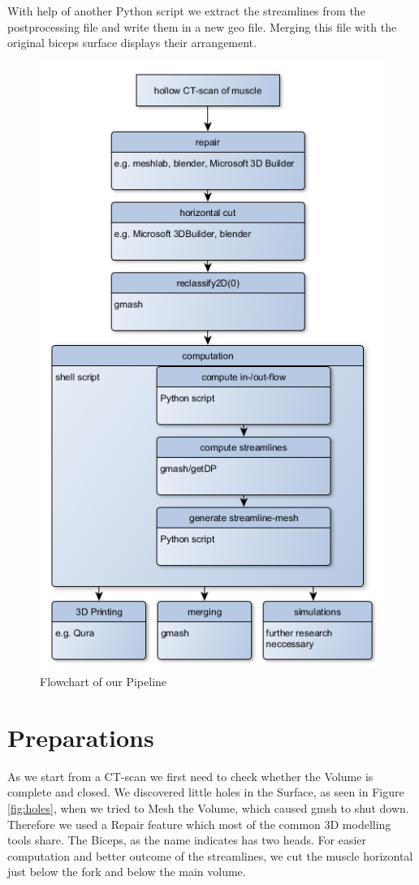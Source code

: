 \documentclass[preprint,journal]{vgtc}       %
\begin{document}
With help of another Python script we extract the streamlines from the postprocessing file and write them in a new geo file. Merging this file with the original biceps surface displays their arrangement.
\begin{figure}
	\begin{center}
		\includegraphics[width=.7\linewidth]{flow.png}
	\end{center}
	\caption{Flowchart of our Pipeline}
	\label{fig:flow}
	
\end{figure}
\section{Preparations}
As we start from a CT-scan we first need to check whether the Volume is complete and closed. We discovered little holes in the Surface, as seen  in Figure \ref{fig:holes}, when we tried to Mesh the Volume, which caused gmsh to shut down. Therefore we used a Repair feature which most of the common 3D modelling tools share. 
The Biceps, as the name indicates has two heads. For easier computation and better outcome of the streamlines, we cut  the muscle horizontal just below the fork and below the main volume. 
\end{document}
